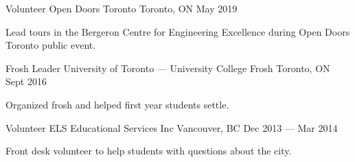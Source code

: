 

\begin{cventries}

  \cventry
    {Volunteer} %
    {Open Doors Toronto} %
    {Toronto, ON} %
    {May 2019} %
    {
    \begin{cvitems} %
        \item {Lead tours in the Bergeron Centre for Engineering Excellence during Open Doors Toronto public event.}
    \end{cvitems}
    }

  \cventry
    {Frosh Leader} %
    {University of Toronto — University College Frosh} %
    {Toronto, ON} %
    {Sept 2016} %
    {
    \begin{cvitems} %
        \item {Organized frosh and helped first year students settle.}
    \end{cvitems}
    }
    
    \cventry
    {Volunteer} %
    {ELS Educational Services Inc} %
    {Vancouver, BC} %
    {Dec 2013 — Mar 2014} %
    {
    \begin{cvitems} %
        \item{Front desk volunteer to help students with questions about the city.}
    \end{cvitems}
    }

\end{cventries}

